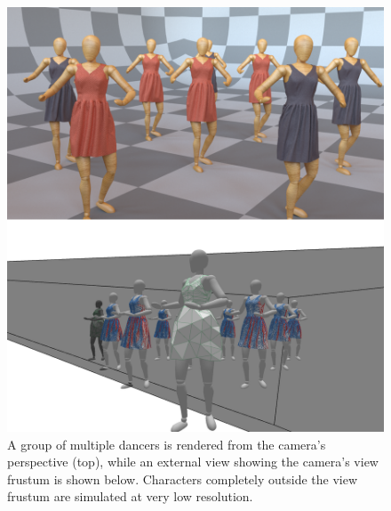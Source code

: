 \documentclass[10pt,journal,compsoc,twoside]{TexInputs/IEEEtran}
\newcommand{\arcsim}{\textsc{Arc}Sim\xspace}
\begin{document}
\begin{figure}[t]
    \centering
    \includegraphics[width=1.0\columnwidth]{crowd/crowd}
    \caption{A group of multiple dancers is rendered from the camera's perspective (top), while 
	an external view showing the camera's view frustum is shown below. Characters
      completely outside the view frustum are simulated at very low resolution.}
    \label{fig:crowd}
\end{figure}

\begin{table}[t]
    \caption{Statistics and timing numbers for the examples. Non-adaptive simulations use a fixed
    high-resolution mesh. 
	Adaptive simulations use the unmodified scheme implemented in \arcsim. %
	View-dependent simulations use the method described in this paper.
	The adaptive simulations are used as a baseline for comparison.  
	The non-adaptive mesh resolution was selected to match the visual quality of the 
	adaptive simulations.
}
\label{table:timings}
    \centering
    \resizebox{\textwidth}{!}{}
\end{table}
\end{document}

